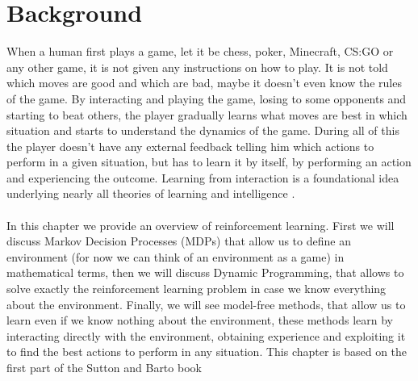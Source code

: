 \chapter{Background}
When a human first plays a game, let it be chess, poker, Minecraft, CS:GO or any other game, it is not given any instructions on how to play. It is not told which moves are good and which are bad, maybe it doesn't even know the rules of the game. By interacting and playing the game, losing to some opponents and starting to beat others, the player gradually learns what moves are best in which situation and starts to understand the dynamics of the game. During all of this the player doesn't have any external feedback telling him which actions to perform in a given situation, but has to learn it by itself, by performing an action and experiencing the outcome. Learning from interaction is a foundational idea underlying nearly all theories of learning and intelligence \cite{sutton-barto}.\\\\
In this chapter we provide an overview of reinforcement learning. First we will discuss Markov Decision Processes (MDPs) that allow us to define an environment (for now we can think of an environment as a game) in mathematical terms, then we will discuss Dynamic Programming, that allows to solve exactly the reinforcement learning problem in case we know everything about the environment. Finally, we will see model-free methods, that allow us to learn even if we know nothing about the environment, these methods learn by interacting directly with the environment, obtaining experience and exploiting it to find the best actions to perform in any situation. This chapter is based on the first part of the Sutton and Barto book \cite{sutton-barto}

